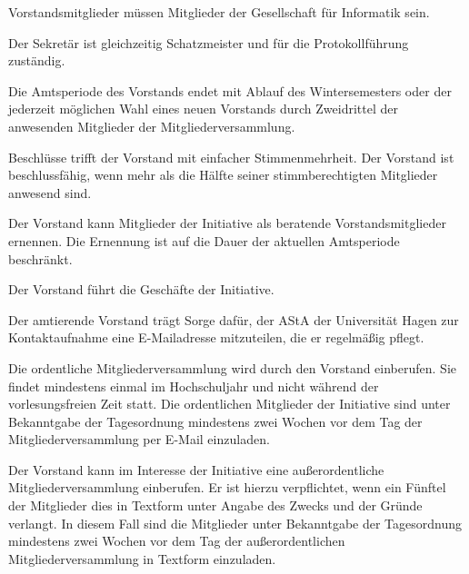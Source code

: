 \begin{contract}
Vorstandsmitglieder müssen Mitglieder der Gesellschaft für Informatik sein.

Der Sekretär ist gleichzeitig Schatzmeister und für die Protokollführung zuständig.

Die Amtsperiode des Vorstands endet mit Ablauf des Wintersemesters oder der jederzeit möglichen Wahl eines neuen Vorstands durch Zweidrittel der anwesenden Mitglieder der Mitgliederversammlung. \label{sec:vorstand-VorzeitigeAbwahl}

Beschlüsse trifft der Vorstand mit einfacher Stimmenmehrheit. Der Vorstand ist beschlussfähig, wenn mehr als die Hälfte seiner stimmberechtigten Mitglieder anwesend sind.

Der Vorstand kann Mitglieder der Initiative als beratende Vorstandsmitglieder ernennen. Die Ernennung ist auf die Dauer der aktuellen Amtsperiode beschränkt.


\label{sec:geschäftsbereichVorstand}

Der Vorstand führt die Geschäfte der Initiative.

Der amtierende Vorstand trägt Sorge dafür, der AStA der Universität Hagen zur Kontaktaufnahme eine E-Mailadresse mitzuteilen, die er regelmäßig pflegt.


\label{sec:mitgliederversammlung}

Die ordentliche Mitgliederversammlung wird durch den Vorstand einberufen. Sie findet mindestens einmal im Hochschuljahr und nicht während der vorlesungsfreien Zeit statt. Die ordentlichen Mitglieder der Initiative sind unter Bekanntgabe der Tagesordnung mindestens zwei Wochen vor dem Tag der Mitgliederversammlung per E-Mail einzuladen.

Der Vorstand kann im Interesse der Initiative eine außerordentliche Mitgliederversammlung einberufen. Er ist hierzu verpflichtet, wenn ein Fünftel der Mitglieder dies in Textform unter Angabe des Zwecks und der Gründe verlangt. In diesem Fall sind die Mitglieder unter Bekanntgabe der Tagesordnung mindestens zwei Wochen vor dem Tag der außerordentlichen Mitgliederversammlung in Textform einzuladen.


\label{sec:aufgabenMitgliederversammlung}


\end{contract}
